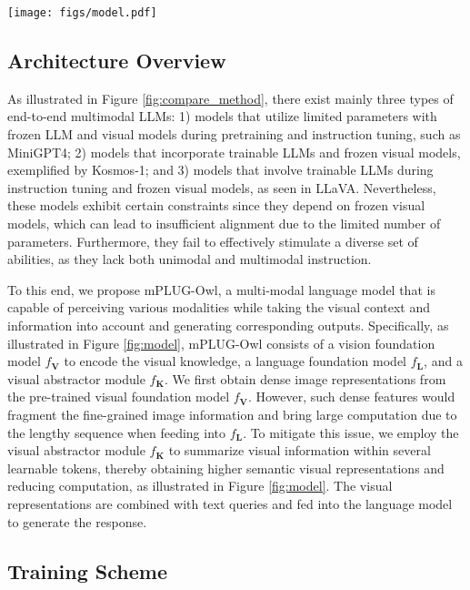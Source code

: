 \documentclass{article}
\newcommand{\modelname}{mPLUG-Owl\xspace}
\begin{document}
\begin{figure*}[!ht]
    \centering
    \texttt{[image: figs/model.pdf]}
    \caption{Our training paradigm and model overview.}
    \label{fig:model}
    \vspace{-2mm}
\end{figure*}

\subsection{Architecture Overview}


As illustrated in Figure \ref{fig:compare_method}, there exist mainly three types of end-to-end multimodal LLMs: 1) models that utilize limited parameters with frozen LLM and visual models during pretraining and instruction tuning, such as MiniGPT4; 2) models that incorporate trainable LLMs and frozen visual models, exemplified by Kosmos-1; and 3) models that involve trainable LLMs during instruction tuning and frozen visual models, as seen in LLaVA. Nevertheless, these models exhibit certain constraints since they depend on frozen visual models, which can lead to insufficient alignment due to the limited number of parameters. Furthermore, they fail to effectively stimulate a diverse set of abilities, as they lack both unimodal and multimodal instruction.

 
To this end, we propose \modelname, a multi-modal language model that is capable of perceiving various modalities while taking the visual context and information into account and generating corresponding outputs. Specifically, as illustrated in Figure \ref{fig:model}, \modelname consists of a vision foundation model $f_{\mathbf{V}}$ to encode the visual knowledge, a language foundation model $f_{\mathbf{L}}$, and a visual abstractor module $f_{\mathbf{K}}$. We first obtain dense image representations from the pre-trained visual foundation model $f_{\mathbf{V}}$. However, such dense features would fragment the fine-grained image information and bring large computation due to the lengthy sequence when feeding into $f_{\mathbf{L}}$. To mitigate this issue, we employ the visual abstractor module $f_{\mathbf{K}}$ to summarize visual information within several learnable tokens, thereby obtaining higher semantic visual representations and reducing computation, as illustrated in Figure \ref{fig:model}. The visual representations are combined with text queries and fed into the language model to generate the response.

\subsection{Training Scheme}
\end{document}
